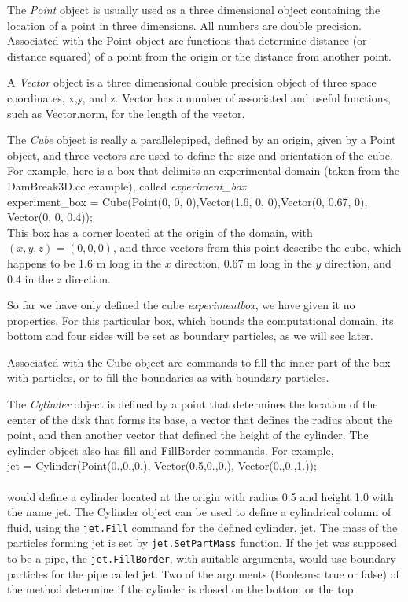 The {\em Point} object is usually used as a three dimensional object
containing the location of a point in three dimensions. All numbers are
double precision. Associated with the Point object are functions that
determine distance (or distance squared) of a point from the origin or
the distance from another point.

A {\em Vector} object is a three dimensional double precision object of
three space coordinates, x,y, and z. Vector has a number of associated
and useful functions, such as Vector.norm, for the length of the vector.


The {\em Cube} object is really a parallelepiped, defined by an origin,
given by a Point object, and three vectors are used to define the size
and orientation of the cube. For example, here is a box that delimits
an experimental domain (taken from the DamBreak3D.cc example), called
{\em experiment\_box.} \\

\noindent experiment\_box = Cube(Point(0, 0, 0),Vector(1.6, 0,
0),Vector(0, 0.67, 0), Vector(0, 0, 0.4));\\

This box has a corner located at the origin of the domain, with $(x, y,
z) = (0,0,0)$, and three vectors from this point describe the cube,
which happens to be 1.6 m long in the $x$ direction, 0.67 m long in the
$y$ direction, and $0.4$ in the $z$ direction.

So far we have only defined the cube {\em experiment\-box}, we have
given it no properties. For this particular box, which bounds the
computational domain, its bottom and four sides will be set as boundary
particles, as we will see later.

Associated with the Cube object are commands to fill the inner part of
the box with particles, or to fill the boundaries as with boundary
particles. %


The {\em Cylinder} object is defined by a point that determines the
location of the center of the disk that forms its base, a vector that
defines the radius about the point, and then another vector that defined
the height of the cylinder. The cylinder object also has fill and
FillBorder commands. For example, \\

jet = Cylinder(Point(0.,0.,0.), Vector(0.5,0.,0.), Vector(0.,0.,1.));\\
\\would define a cylinder located at the origin with radius 0.5 and
height 1.0 with the name jet. The Cylinder object can be used to
define a cylindrical column of fluid, using the \verb!jet.Fill!
command for the defined cylinder, jet. The mass of the particles
forming jet is set by \verb!jet.SetPartMass! function. If the jet was
supposed to be a pipe, the \verb!jet.FillBorder!, with suitable
arguments, would use boundary particles for the pipe called jet. Two
of the arguments (Booleans: true or false) of the method determine if
the cylinder is closed on the bottom or the top.

